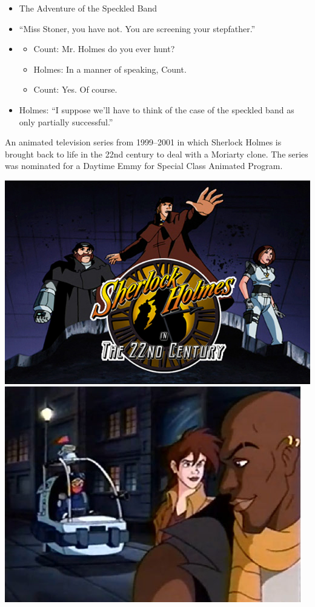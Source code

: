 \documentclass[a4paper,landscape,headrule,footrule,xetex]{foils}
\begin{document}

\begin{itemize}
\item The Adventure of the Speckled Band
\item “Miss Stoner, you have not. You are screening your
stepfather.”
\item 
  \begin{itemize}
  \item Count: Mr. Holmes do you ever hunt?
  \item Holmes: In a manner of speaking, Count.
  \item Count: Yes. Of course.
  \end{itemize}
\item Holmes: “I suppose we’ll have to think of the case
of the speckled band as only partially successful.”
\end{itemize}


An animated television series from 1999--2001 in which Sherlock Holmes
is brought back to life in the 22nd century to deal with a Moriarty
clone. The series was nominated for a Daytime Emmy for Special Class
Animated Program.


\hspace{-2.5cm}\includegraphics[height=0.6\textheight]{pics/Sherlock-Holmes-in-the-22nd-Century.jpg}
\includegraphics[height=0.6\textheight]{pics/22ndirregulars.JPG}
\end{document}

